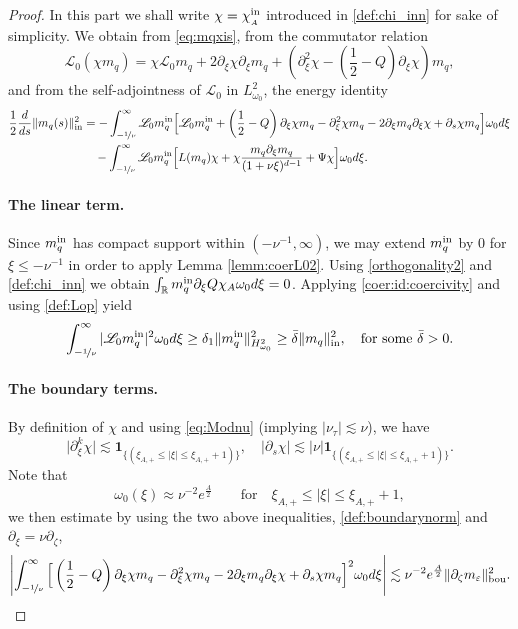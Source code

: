 \documentclass[11pt]{aims}
\theoremstyle{definition}
\newcommand{\Ls}{\mathscr{L}}
\newcommand{\pa}{\partial}
\newcommand{\inn}{\textup{in}}
\newcommand{\bd}{\textup{bou}}
\newcommand{\be}{\begin{equation}}
\newcommand{\ee}{\end{equation}}
\numberwithin{equation}{section}
\begin{document}
\begin{proof} In this part we shall write $\chi = \chi_{_{A}}^\inn$ introduced in \eqref{def:chi_inn} for sake of simplicity. We obtain from \eqref{eq:mqxis}, from the commutator relation
$$
\Ls_0 (\chi m_q)=\chi\Ls_0m_q+2\pa_\xi \chi \pa_\xi m_q+\left(\pa_\xi^2 \chi-(\frac 12-Q)\pa_\xi \chi\right)m_q,
$$
and from the self-adjointness of $\Ls_0$ in $L^2_{\omega_0}$, the energy identity
\begin{align}
\nonumber \frac{1}{2}\frac{d}{ds}\| m_q(s)\|^2_\inn &= -\int_{-\nicefrac{1}{\nu}} ^\infty \Ls_0 m_q^\inn\Big[ \Ls_0 m_q^\inn + \left(\frac 12  - Q \right)\pa_\xi \chi m_q - \pa_\xi^2\chi m_q - 2 \pa_\xi m_q \pa_\xi \chi + \pa_s \chi m_q  \Big]\omega_0 d\xi\\
\label{inner:id:energy} &\quad - \int_{-\nicefrac{1}{\nu}}^\infty  \Ls_0 m_q^\inn\Big[ L(m_q)\chi +\chi \frac{m_q \pa_\xi m_q}{(1  +\nu \xi)^{d-1}} + \Psi \chi \Big]  \omega_0 d\xi.
\end{align}

\paragraph{The linear term.} Since $m_q^\inn$ has compact support within $(-\nu^{-1},\infty)$, we may extend $m_q^\inn$ by $0$ for $\xi\leq -\nu^{-1}$ in order to apply Lemma \ref{lemm:coerL02}. Using \eqref{orthogonality2} and \eqref{def:chi_inn} we obtain $\int_{\mathbb R}m_q^\inn \pa_\xi Q \chi_A \omega_0d\xi=0$. Applying \eqref{coer:id:coercivity} and using \eqref{def:Lop} yield
\be \label{inner:bd:linear}
\int_{-\nicefrac{1}{\nu}} ^\infty |\Ls_0 m_q^\inn|^2\omega_0 d\xi \geq \delta_1 \| m_q^\inn\|_{H^2_{\omega_0}}^2\geq \bar \delta \| m_q\|_{\inn}^2, \quad \textup{for some $\bar \delta>0$.}
\ee

\paragraph{The boundary terms.} By definition of $\chi$ and using \eqref{eq:Modnu} (implying $|\nu_\tau|\lesssim \nu$), we have 
\be \label{inner:bd:boundary}
\big|\pa_\xi^k \chi\big| \lesssim \mathbf{1}_{\{(\xi_{A,+} \leq |\xi|\leq \xi_{A,+} + 1)\}}, \quad \big|\pa_s \chi \big| \lesssim |\nu| \mathbf{1}_{\{(\xi_{A,+} \leq |\xi| \leq  \xi_{A,+} + 1)\}}.
\ee
Note that
\be \label{inner:id:omega0boundary}
\omega_0(\xi)\approx \nu^{-2}e^{\frac A2} \qquad \mbox{for}\quad \xi_{A,+} \leq |\xi| \leq \xi_{A,+} + 1,
\ee
we then estimate by using the two above inequalities, \eqref{def:boundarynorm} and $\pa_\xi=\nu \pa_\zeta$,
\be
\label{inner:bd:boundaryterm} \left|\int_{-\nicefrac{1}{\nu}} ^\infty \Big[ \left( \frac 12 - Q \right)\pa_\xi \chi m_q - \pa_\xi^2\chi m_q - 2 \pa_\xi m_q \pa_\xi \chi+\pa_s \chi m_q \Big]^2\omega_0 d\xi\right|  \lesssim \nu^{-2} e^{\frac A2} \| \pa_\zeta m_\varepsilon \|_{\bd}^2.
\ee


\end{proof}
\end{document}
